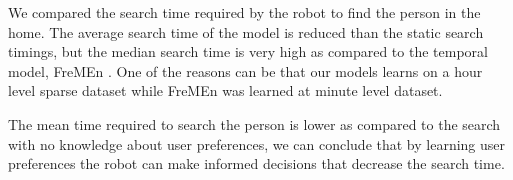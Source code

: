 We compared the search time required by the robot to find the person in the home. The average search time of the model is reduced than the static search timings, but the median search time is very high as compared to the temporal model, FreMEn \citep{krajnik_wheres_2015}. One of the reasons can be that our models learns on a hour level sparse dataset while FreMEn was learned at minute level dataset. 

The mean time required to search the person is lower as compared to the search with no knowledge about user preferences, we can conclude that by learning user preferences the robot can make informed decisions that decrease the search time.






